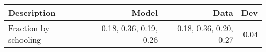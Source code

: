 \begin{tabular}{lrrr}
\hline
Description & Model  & Data  & Dev  \\ 
\hline
Fraction by schooling & 0.18, 0.36, 0.19, 0.26  & 0.18, 0.36, 0.20, 0.27  & 0.04  \\ 
\hline
\end{tabular}%
